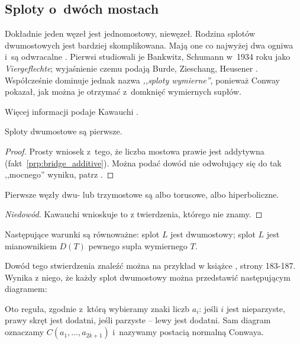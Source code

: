 
\subsection{Sploty o~dwóch mostach}
\label{sub:twobridge}%
%
%
Dokładnie jeden węzeł jest jednomostowy, niewęzeł.
Rodzina splotów dwumostowych jest bardziej skomplikowana.
Mają one co najwyżej dwa ogniwa i~są odwracalne \cite[s. 211]{burde2014}.
Pierwsi studiowali je Bankwitz, Schumann \cite{bankwitz1934} w~1934 roku jako \emph{Viergeflechte}; wyjaśnienie czemu podają Burde, Zieschang, Heusener \cite[s. 25]{burde2014}.
Współcześnie dominuje jednak nazwa \emph{,,sploty wymierne''}, ponieważ Conway pokazał, jak można je otrzymać z~domknięć wymiernych supłów.

Więcej informacji podaje Kawauchi \cite[s. 21-26]{kawauchi1996}.

\begin{proposition}
    Sploty dwumostowe są pierwsze.
\end{proposition}

\begin{proof}
    Prosty wniosek z~tego, że liczba mostowa prawie jest addytywna (fakt~\ref{prp:bridge_additive}).
    Można podać dowód nie odwołujący się do tak ,,mocnego'' wyniku, patrz \cite[s. 100]{burde2014}.
\end{proof}

\begin{corollary}
    Pierwsze węzły dwu- lub trzymostowe są albo torusowe, albo hiperboliczne.
\end{corollary}

\begin{proof}[Niedowód]
    Kawauchi \cite[s. 130]{kawauchi1996} wnioskuje to z twierdzenia, którego nie znamy.
\end{proof}

\begin{proposition}
    Następujące warunki są równoważne: splot $L$ jest dwumostowy; splot $L$ jest mianownikiem $D(T)$ pewnego supła wymiernego $T$.
\end{proposition}

Dowód tego stwierdzenia znaleźć można na przykład w książce \cite{murasugi1996}, strony 183-187.
Wynika z niego, że każdy splot dwumostowy można przedstawić następującym diagramem:


Oto reguła, zgodnie z~którą wybieramy znaki liczb $a_i$:
jeśli $i$ jest nieparzyste, prawy skręt jest dodatni, jeśli parzyste -- lewy jest dodatni.
Sam diagram oznaczamy $C(a_1, \ldots, a_{2k+1})$ i~nazywamy postacią normalną Conwaya.

